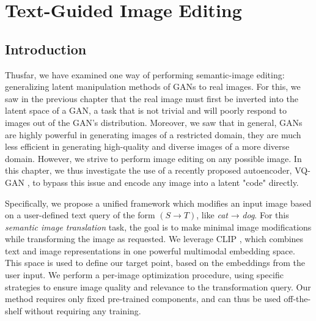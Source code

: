 \chapter{Text-Guided Image Editing}
\label{chapter:flexit}

\newpage

\minitoc
{}



\section{Introduction}

Thusfar, we have examined one way of performing semantic-image editing: 
generalizing latent manipulation methods of \ac{GAN}s to real images. For this, 
we saw in the previous chapter that the real image must first be inverted into 
the latent space of a \ac{GAN}, a task that is not trivial and will poorly respond to 
 images out of the \ac{GAN}'s distribution. Moreover, we saw that in general, \ac{GAN}s 
 are highly powerful in generating images of a restricted domain, they are much less 
 efficient in generating high-quality and diverse images of a more diverse domain. 
 However, we strive to perform image editing on any possible image. In this chapter, 
 we thus investigate the use of a recently proposed autoencoder, VQ-GAN \citep{esser2021taming}, 
 to bypass this issue and encode any image into a latent "code" directly. 
 
Specifically, we propose  a unified framework which modifies an input image based
 on a user-defined text query of the form $(S \rightarrow T)$, like \textit{cat} → \textit{dog}.
  For this \textit{semantic image translation} task, the goal is to make minimal image
   modifications  while transforming the image as requested.
We leverage \ac{CLIP} \citep{radford2021learning},  which combines text and image representations in 
one powerful multimodal embedding space. This space is used to define our target point,
 based on the embeddings from the user input. We perform a per-image optimization 
 procedure, using specific  strategies to ensure image quality and relevance to the 
 transformation query. Our method requires only fixed pre-trained components, and can 
 thus be used off-the-shelf  without  requiring any training. 

